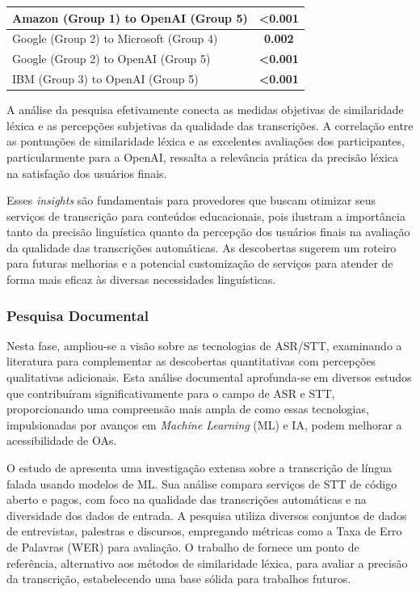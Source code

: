 \begin{table}[htb]
\begin{tabular}{|lcccc|}
\multicolumn{3}{|l|}{Amazon (Group 1) to OpenAI (Group 5)} & \multicolumn{2}{c|}{\textbf{\textless 0.001}} \\ \hline
\multicolumn{3}{|l|}{Google (Group 2) to Microsoft (Group 4)} & \multicolumn{2}{c|}{\textbf{0.002}} \\ \hline
\multicolumn{3}{|l|}{Google (Group 2) to OpenAI (Group 5)} & \multicolumn{2}{c|}{\textbf{\textless 0.001}} \\ \hline
\multicolumn{3}{|l|}{IBM (Group 3) to OpenAI (Group 5)} & \multicolumn{2}{c|}{\textbf{\textless 0.001}} \\ \hline
\end{tabular}
\end{table}

A análise da pesquisa efetivamente conecta as medidas objetivas de similaridade léxica e as percepções subjetivas da qualidade das transcrições. A correlação entre as pontuações de similaridade léxica e as excelentes avaliações dos participantes, particularmente para a OpenAI, ressalta a relevância prática da precisão léxica na satisfação dos usuários finais. 

Esses \textit{insights} são fundamentais para provedores que buscam otimizar seus serviços de transcrição para conteúdos educacionais, pois ilustram a importância tanto da precisão linguística quanto da percepção dos usuários finais na avaliação da qualidade das transcrições automáticas. As descobertas sugerem um roteiro para futuras melhorias e a potencial customização de serviços para atender de forma mais eficaz às diversas necessidades linguísticas.

\subsubsection{Pesquisa Documental}

Nesta fase, ampliou-se a visão sobre as tecnologias de ASR/STT, examinando a literatura para complementar as descobertas quantitativas com percepções qualitativas adicionais. Esta análise documental aprofunda-se em diversos estudos que contribuíram significativamente para o campo de ASR e STT, proporcionando uma compreensão mais ampla de como essas tecnologias, impulsionadas por avanços em \textit{Machine Learning} (ML) e IA, podem melhorar a acessibilidade de OAs.

O estudo de  apresenta uma investigação extensa sobre a transcrição de língua falada usando modelos de ML. Sua análise compara serviços de STT de código aberto e pagos, com foco na qualidade das transcrições automáticas e na diversidade dos dados de entrada. A pesquisa utiliza diversos conjuntos de dados de entrevistas, palestras e discursos, empregando métricas como a Taxa de Erro de Palavras (WER) para avaliação. O trabalho de  fornece um ponto de referência, alternativo aos métodos de similaridade léxica, para avaliar a precisão da transcrição, estabelecendo uma base sólida para trabalhos futuros.

